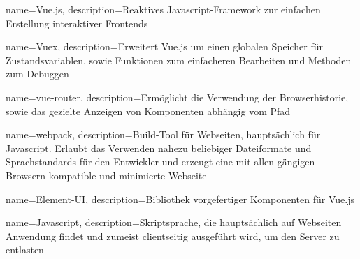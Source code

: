  {
  name=Vue.js,
  description={Reaktives \gls{Javascript}-Framework zur einfachen Erstellung interaktiver Frontends}
}

 {
  name=Vuex,
  description={Erweitert \gls{Vue.js} um einen globalen Speicher für Zustandsvariablen, sowie Funktionen zum einfacheren Bearbeiten und Methoden zum Debuggen}
}

 {
  name=vue-router,
  description={Ermöglicht die Verwendung der Browserhistorie, sowie das gezielte Anzeigen von Komponenten abhängig vom Pfad}
}

 {
  name=webpack,
  description={Build-Tool für Webseiten, hauptsächlich für Javascript. Erlaubt das Verwenden nahezu beliebiger Dateiformate und Sprachstandards
  für den Entwickler und erzeugt eine mit allen gängigen Browsern kompatible und minimierte Webseite}
}

 {
  name=Element-UI,
  description={Bibliothek vorgefertiger Komponenten für \gls{Vue.js}}
}

 {
  name=Javascript,
  description={Skriptsprache, die hauptsächlich auf Webseiten Anwendung findet und zumeist clientseitig ausgeführt wird, um den Server zu entlasten}
}
